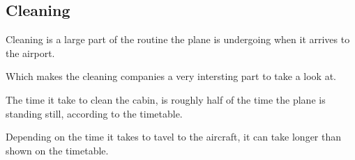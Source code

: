 \subsection{Cleaning}
Cleaning is a large part of the routine the plane is undergoing when it arrives to the airport.

Which makes the cleaning companies a very intersting part to take a look at.

The time it take to clean the cabin, is roughly half of the time the plane is standing still, according to the timetable.

Depending on the time it takes to tavel to the aircraft, it can take longer than shown on the timetable.





